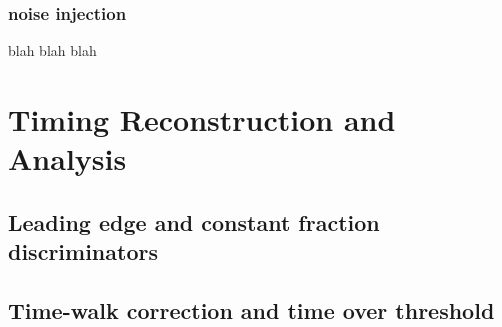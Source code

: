 \documentclass[preprint,1p]{elsarticle}
\begin{document}
\subsubsection{noise injection}\label{sec:noise_simulation}
blah blah blah
\section{Timing Reconstruction and Analysis}
\label{sec:timing_and_analysis}

\subsection{Leading edge and constant fraction discriminators}
\label{sec:le_and_cfd}

\subsection{Time-walk correction and time over threshold}
\label{sec:tw_and_tot}

\end{document}
